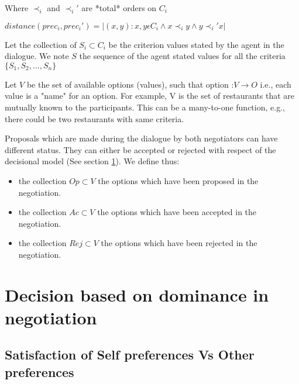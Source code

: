\documentclass{article}
\begin{document}
		Where $\prec_i$ and $\prec_i'$ are *total* orders on $C_i$
		
		$distance(prec_i, prec_i') = | { (x, y) : x,y \epsilon C_i \wedge x \prec_i y \wedge y \prec_i' x} |$
		
		Let the collection of $S_i \subset C_i$ be the criterion values stated by the agent in the dialogue. We note $S$ the sequence of the agent stated values for all the criteria $\{S_1, S_2,..., S_n\}$
		
		Let $V$ be the set of available options (values), such that option :$ V\rightarrow O$	i.e., each value is a "name" for an option.  For example, V is the set of restaurants that are mutually known to the participants. This can be a many-to-one function, e.g., there could be two restaurants with same criteria.			
		
		Proposals which are made during the dialogue by both negotiators can have different status. They can either be accepted or rejected with respect of the decisional model (See section \ref{decision}). We define thus:
		\begin{itemize}
			\item the collection $Op \subset V$ the options which have been proposed in the negotiation.
			\item the collection $Ac \subset V$  the options which have been accepted in the negotiation.
			\item the collection $Rej \subset V$  the options which have been rejected in the negotiation.
			
		\end{itemize} 

	\section{Decision based on dominance in negotiation}
	\label{decision}
	\subsection{Satisfaction of Self preferences Vs Other preferences}
	
\end{document}
